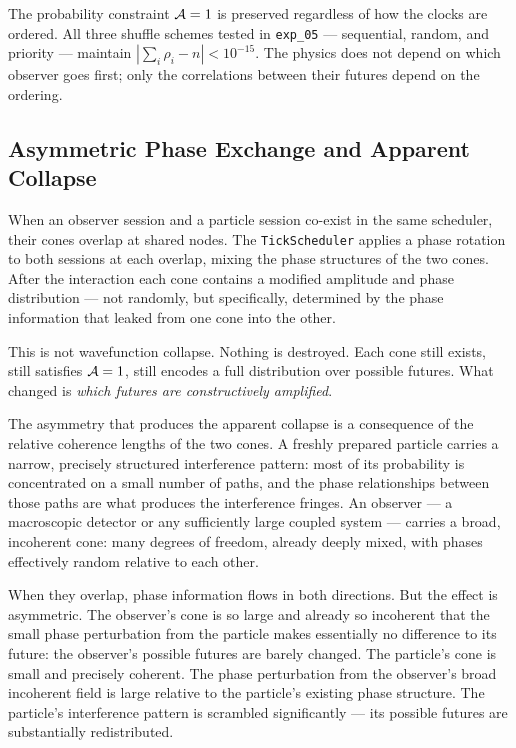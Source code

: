 The probability constraint $\mathcal{A}=1$ is preserved regardless of how the
clocks are ordered.  All three shuffle schemes tested in
\texttt{exp\_05} — sequential, random, and priority — maintain
$|\sum_i \rho_i - n| < 10^{-15}$.  The physics does not depend on
which observer goes first; only the correlations between their futures
depend on the ordering.

\subsection{Asymmetric Phase Exchange and Apparent Collapse}
\label{subsec:apparent_collapse}

When an observer session and a particle session co-exist in the same
scheduler, their cones overlap at shared nodes.  The \texttt{TickScheduler}
applies a phase rotation to both sessions at each overlap, mixing the
phase structures of the two cones.  After the interaction each cone
contains a modified amplitude and phase distribution — not randomly, but
specifically, determined by the phase information that leaked from one
cone into the other.

This is not wavefunction collapse.  Nothing is destroyed.  Each cone
still exists, still satisfies $\mathcal{A}=1$, still encodes a full
distribution over possible futures.  What changed is \emph{which futures
are constructively amplified}.

The asymmetry that produces the apparent collapse is a consequence of the
relative coherence lengths of the two cones.  A freshly prepared particle
carries a narrow, precisely structured interference pattern: most of its
probability is concentrated on a small number of paths, and the phase
relationships between those paths are what produces the interference
fringes.  An observer — a macroscopic detector or any sufficiently large
coupled system — carries a broad, incoherent cone: many degrees of
freedom, already deeply mixed, with phases effectively random relative to
each other.

When they overlap, phase information flows in both directions.  But the
effect is asymmetric.  The observer's cone is so large and already so
incoherent that the small phase perturbation from the particle makes
essentially no difference to its future: the observer's possible futures
are barely changed.  The particle's cone is small and precisely coherent.
The phase perturbation from the observer's broad incoherent field is
large relative to the particle's existing phase structure.  The
particle's interference pattern is scrambled significantly — its possible
futures are substantially redistributed.


